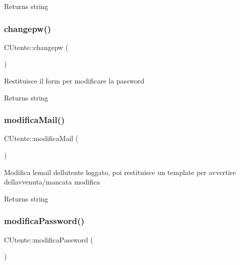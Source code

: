 \begin{DoxyReturn}{Returns}
string 
\end{DoxyReturn}
\mbox{\label{class_c_utente_adf02d17b2d62f9b23307762f1eff4810}} 
\subsubsection{\texorpdfstring{changepw()}{changepw()}}
{\footnotesize\ttfamily C\+Utente\+::changepw (\begin{DoxyParamCaption}{ }\end{DoxyParamCaption})}

Restituisce il form per modificare la password

\begin{DoxyReturn}{Returns}
string 
\end{DoxyReturn}
\mbox{\label{class_c_utente_a54eb20a68010ef23c17edbf5cf6f3487}} 
\subsubsection{\texorpdfstring{modifica\+Mail()}{modificaMail()}}
{\footnotesize\ttfamily C\+Utente\+::modifica\+Mail (\begin{DoxyParamCaption}{ }\end{DoxyParamCaption})}

Modifica l\textquotesingle{}email dell\textquotesingle{}utente loggato, poi restituisce un template per avvertire dell\textquotesingle{}avvenuta/mancata modifica

\begin{DoxyReturn}{Returns}
string 
\end{DoxyReturn}
\mbox{\label{class_c_utente_a9a481981f75ef84d57cd83aaada7b1c1}} 
\subsubsection{\texorpdfstring{modifica\+Password()}{modificaPassword()}}
{\footnotesize\ttfamily C\+Utente\+::modifica\+Password (\begin{DoxyParamCaption}{ }\end{DoxyParamCaption})}

